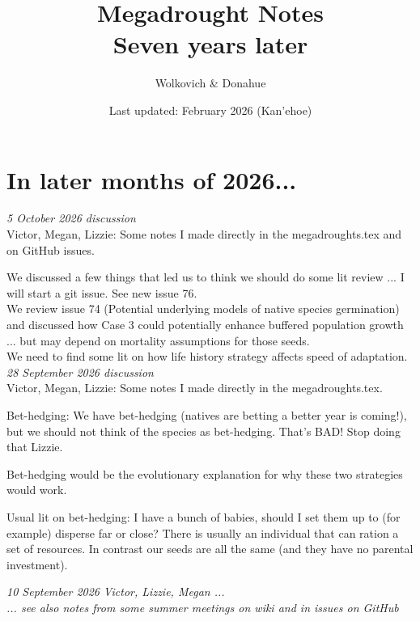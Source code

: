 \documentclass[11pt]{article}
\begin{document}
\renewcommand{\refname}{\CHead{}}

\title{Megadrought Notes \\ Seven years later}
    \author{Wolkovich \& Donahue}
\date{Last updated: February 2026 (Kan'ehoe) \\ } %
\maketitle 

\tableofcontents


\section{In later months of 2026... }

\emph{5 October 2026 discussion}\\
Victor, Megan, Lizzie: Some notes I made directly in the megadroughts.tex and on GitHub issues.

We discussed a few things that led us to think we should do some lit review ... I will start a git issue. See new issue 76. \\
We review issue 74 (Potential underlying models of native species germination) and discussed how Case 3 could potentially enhance buffered population growth ... but may depend on mortality assumptions for those seeds.\\
We need to find some lit on how life history strategy affects speed of adaptation. \\


\emph{28 September 2026 discussion}\\
Victor, Megan, Lizzie: Some notes I made directly in the megadroughts.tex.

Bet-hedging: We have bet-hedging (natives are betting a better year is coming!), but we should not think of the species as bet-hedging. That's BAD! Stop doing that Lizzie. 

Bet-hedging would be the evolutionary explanation for why these two strategies would work. 

Usual lit on bet-hedging: I have a bunch of babies, should I set them up to (for example) disperse far or close? There is usually an individual that can ration a set of resources. In contrast our seeds are all the same (and they have no parental investment). 



\emph{10 September 2026}
\emph{Victor, Lizzie, Megan ... \\ ... see also notes from some summer meetings on wiki and in issues on GitHub}
\end{document}
